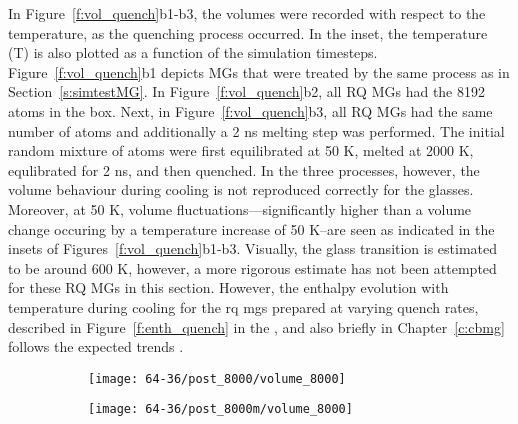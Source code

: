 In Figure~\ref{f:vol_quench}b1-b3, the volumes were recorded with respect to the temperature, as the quenching process occurred. In the inset, the temperature (T) is also plotted as a function of the simulation timesteps. Figure~\ref{f:vol_quench}b1 depicts MGs that were treated by the same process as in Section~\ref{s:simtestMG}. In Figure~\ref{f:vol_quench}b2, all RQ MGs had the 8192 atoms in the box. Next, in Figure~\ref{f:vol_quench}b3, all RQ MGs had the same number of atoms and additionally a 2 ns melting step was performed. The initial random mixture of atoms were first equilibrated at 50 K, melted at 2000 K, equlibrated for 2 ns, and then quenched. In the three processes, however, the volume behaviour during cooling is not reproduced correctly for the glasses. Moreover, at 50 K, volume fluctuations---significantly higher than a volume change occuring by a temperature increase of 50 K--are seen as indicated in the insets of Figures~\ref{f:vol_quench}b1-b3. Visually, the glass transition is estimated to be around 600 K, however, a more rigorous estimate has not been attempted for these RQ MGs in this section. However, the enthalpy evolution with temperature during cooling for the \gls{rq} \gls{mg}s prepared at varying quench rates, described in Figure~\ref{f:enth_quench} in the , and also briefly in Chapter~\ref{c:cbmg} follows the expected trends \cite{Berthier2016,Ediger1996}. \par

\begin{figure}%
	\centering
	\begin{subfigure}{0.5\textwidth}
		\texttt{[image: 64-36/post\_8000/volume\_8000]}
		\caption{}
	\end{subfigure}%
	\begin{subfigure}{0.5\textwidth}
		\texttt{[image: 64-36/post\_8000m/volume\_8000]}
		\caption{}
	\end{subfigure}
	\label{f:vol_quench64}
\end{figure}

